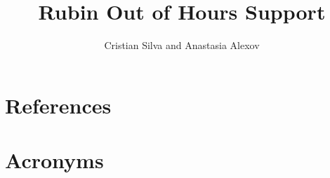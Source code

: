 \documentclass[OPS,authoryear,toc]{lsstdoc}
\title{Rubin Out of Hours Support}
\author{%
Cristian Silva and Anastasia Alexov 
}
\date{\vcsDate}
\begin{document}
\maketitle




\appendix
\section{References} \label{sec:bib}
\renewcommand{\refname}{} %


\section{Acronyms} \label{sec:acronyms}

\end{document}
